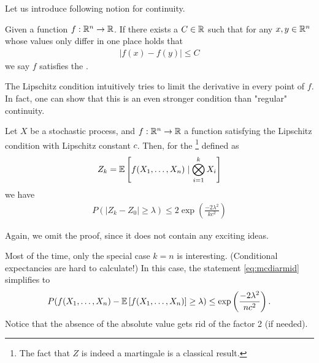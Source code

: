 Let us introduce following notion for continuity.
\begin{definition}
    Given a function $f : \mathbb{R}^n \rightarrow \mathbb{R}$.
    If there exists a $C \in \mathbb{R}$ such that for any $x,y \in \mathbb{R}^n$ whose values only differ in one place holds that
    \begin{align}
        |f(x) - f(y)| \leq C
    \end{align}
    we say $f$ satisfies the .
\end{definition}
The Lipschitz condition intuitively tries to limit the derivative in every point of $f$.
In fact, one can show that this is an even stronger condition than "regular" continuity.
\begin{theorem} \label{thm:mcdiarmid}
    Let $X$ be a stochastic process, and $f : \mathbb{R}^n \rightarrow \mathbb{R}$ a function satisfying the Lipschitz condition with Lipschitz constant $c$.
    Then, for the \footnote{The fact that $Z$ is indeed a martingale is a classical result.} defined as
    \begin{align}
        Z_k = \mathbb{E}\left[f(X_1, \dots, X_n) \mid \bigotimes_{i=1}^k X_i\right]
    \end{align}
    we have
    \begin{align} \label{eq:mcdiarmid}
        P(|Z_k - Z_0| \geq \lambda) \leq 2\exp\left(\frac{-2\lambda^2}{kc^2}\right)
    \end{align}
\end{theorem}
Again, we omit the proof, since it does not contain any exciting ideas.
\begin{remark}
    Most of the time, only the special case $k=n$ is interesting.
    (Conditional expectancies are hard to calculate!)
    In this case, the statement \eqref{eq:mcdiarmid} simplifies to
    \begin{align}
        P(f(X_1, \dots, X_n) - \mathbb{E}\left[f(X_1, \dots, X_n)\right] \geq \lambda) \leq \exp\left(\frac{-2\lambda^2}{nc^2}\right).
    \end{align}
    Notice that the absence of the absolute value gets rid of the factor 2 (if needed).
\end{remark}


